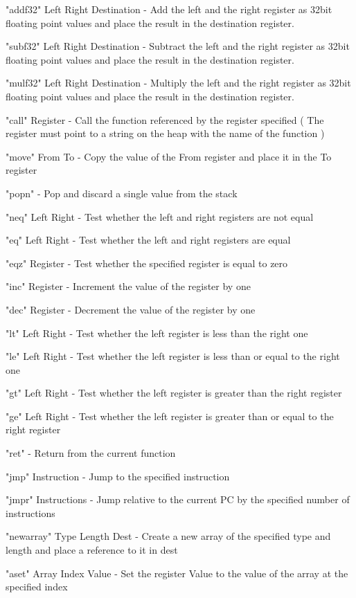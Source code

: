 \documentclass[]{final_report}
\begin{document}
"addf32" Left Right Destination - Add the left and the right register as 32bit floating point values and place the result in the destination register.

"subf32" Left Right Destination - Subtract the left and the right register as 32bit floating point values and place the result in the destination register.

"mulf32" Left Right Destination - Multiply the left and the right register as 32bit floating point values and place the result in the destination register.

"call" Register - Call the function referenced by the register specified ( The register must point to a string on the heap with the name of the function )

"move" From To - Copy the value of the From register and place it in the To register

"popn" - Pop and discard a single value from the stack

"neq" Left Right - Test whether the left and right registers are not equal

"eq" Left Right - Test whether the left and right registers are equal

"eqz" Register - Test whether the specified register is equal to zero

"inc" Register - Increment the value of the register by one

"dec" Register - Decrement the value of the register by one

"lt" Left Right - Test whether the left register is less than the right one

"le" Left Right - Test whether the left register is less than or equal to the right one

"gt" Left Right - Test whether the left register is greater than the right register

"ge" Left Right - Test whether the left register is greater than or equal to the right register

"ret" - Return from the current function

"jmp" Instruction - Jump to the specified instruction

"jmpr" Instructions - Jump relative to the current PC by the specified number of instructions

"newarray" Type Length Dest - Create a new array of the specified type and length and place a reference to it in dest

"aset" Array Index Value - Set the register Value to the value of the array at the specified index
\end{document}
